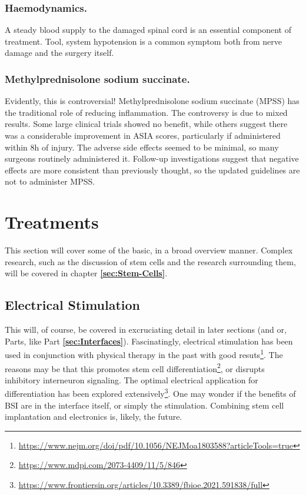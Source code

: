 \documentclass[12pt]{report}
\begin{document}
\subsubsection{Haemodynamics.}
A steady blood supply to the damaged spinal cord is an essential component of treatment. Tool, system hypotension is a common symptom both from nerve damage and the surgery itself. 

\subsubsection{Methylprednisolone sodium succinate.}
Evidently, this is controversial! Methylprednisolone sodium succinate (MPSS) has the traditional role of reducing inflammation. The controversy is due to mixed results. Some large clinical trials showed no benefit, while others suggest there was a considerable improvement in ASIA scores, particularly if administered within 8h of injury. The adverse side effects seemed to be minimal, so many surgeons routinely administered it. Follow-up investigations suggest that negative effects are more consistent than previously thought, so the updated guidelines are not to administer MPSS. 

\section{Treatments}

This section will cover some of the basic, in a broad overview manner. Complex research, such as the discussion of stem cells and the research surrounding them, will be covered in chapter \textbf{\ref{sec:Stem-Cells}}. \newline

\subsection{Electrical Stimulation}

This will, of course, be covered in excruciating detail in later sections (and or, Parts, like Part \textbf{\ref{sec:Interfaces}}). Fascinatingly, electrical stimulation has been used in conjunction with physical therapy in the past with good resuts\footnote{\url{https://www.nejm.org/doi/pdf/10.1056/NEJMoa1803588?articleTools=true}}. The reasons may be that this promotes stem cell differentiation\footnote{\url{https://www.mdpi.com/2073-4409/11/5/846}}, or disrupts inhibitory interneuron signaling. The optimal electrical application for differentiation has been explored extensively\footnote{\url{https://www.frontiersin.org/articles/10.3389/fbioe.2021.591838/full}}. One may wonder if the benefits of BSI are in the interface itself, or simply the stimulation. Combining stem cell implantation and electronics is, likely, the future.\newline
\end{document}
